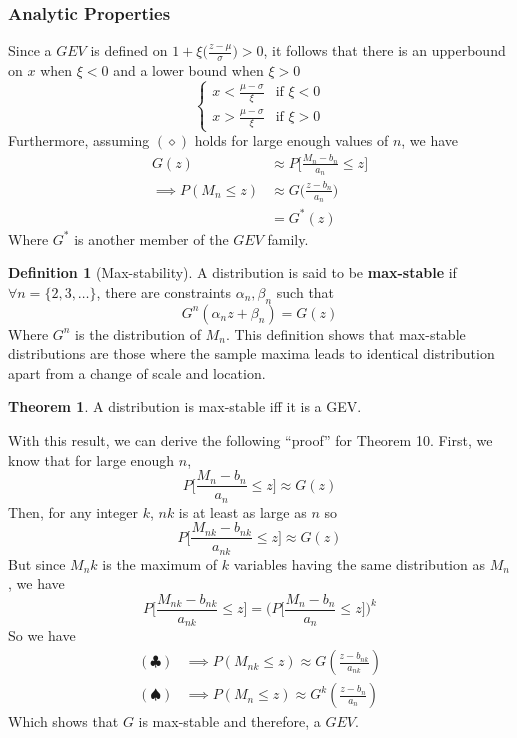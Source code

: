 \documentclass{article}
\theoremstyle{definition}
\newtheorem{theorem}{Theorem}
\theoremstyle{definition}
\newtheorem{definition}{Definition}
\begin{document}
\subsubsection{Analytic Properties}
Since a $GEV$ is defined on $1+\xi \bigg(\frac{z-\mu}{\sigma}\bigg)>0$, it follows that there is an upperbound on $x$ when $\xi<0$ and a lower bound when $\xi>0$
\[\begin{cases}
x < \frac{\mu-\sigma}{\xi}& \text{if }\xi<0\\
x > \frac{\mu-\sigma}{\xi}& \text{if }\xi>0
\end{cases}\]
Furthermore, assuming $(\diamond)$ holds for large enough values of $n$, we have 
\begin{align*}
    G(z)&\approx P \bigg[\frac{M_n-b_n}{a_n}\leq z \bigg]\\
    \implies P(M_n\leq z)& \approx G\bigg(\frac{z-b_n}{a_n}\bigg)\\
    &=G^*(z)
\end{align*}
Where $G^*$ is another member of the $GEV$ family.
\begin{definition}[Max-stability] A distribution is said to be \textbf{max-stable} if $\forall n=\{2,3,\hdots\}$, there are constraints $\alpha_n,\beta_n$ such that 
\[G^n(\alpha_nz+\beta_n)=G(z)\]
Where $G^n$ is the distribution of $M_n$. This definition shows that max-stable distributions are those where the sample maxima leads to identical distribution apart from a change of scale and location. 

\end{definition}
\begin{theorem}
A distribution is max-stable iff it is a GEV.
\end{theorem}
\noindent With this result, we can derive the following ``proof'' for Theorem 10. First, we know that for large enough $n$,
\[P\bigg[\frac{M_n-b_n}{a_n}\leq z \bigg]  \approx G(z)\]
Then, for any integer $k$, $nk$ is at least as large as $n$ so
\[P\bigg[\frac{M_{nk}-b_{nk}}{a_{nk}}\leq z \bigg]  \approx G(z) \tag{$\clubsuit$}\]
But since $M_nk$ is the maximum of $k$ variables having the same distribution as $M_n$, we have
\[P\bigg[\frac{M_{nk}-b_{nk}}{a_{nk}}\leq z \bigg] =\bigg( P\bigg[\frac{M_n-b_n}{a_n}\leq z \bigg]\bigg)^k \tag{$\spadesuit$}\]
So we have
\begin{align*}
    (\clubsuit)&\implies P(M_{nk}\leq z)\approx G(\frac{z-b_{nk}}{a_{nk}})\\
    (\spadesuit)&\implies P(M_{n}\leq z)\approx G^k(\frac{z-b_n}{a_n})
\end{align*}
Which shows that $G$ is max-stable and therefore, a $GEV$.
\end{document}
